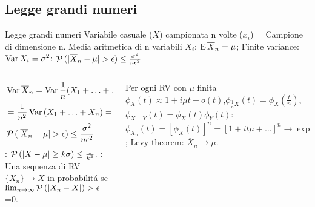 \subsection{Legge grandi numeri}

\begin{frame}{Legge grandi numeri}
Variabile casuale ($X$) campionata n volte ($x_i$) = Campione di dimensione n.
    Media aritmetica di n variabili $X_i$: $\operatorname{E}{\overline{X}_n}=\mu$; Finite variance: $\operatorname{Var}{X_i}=\sigma^2$: $\prob{(|\overline{X}_n-\mu|>\epsilon)}\leq\frac{\sigma^2}{n\epsilon^2}$
    \begin{columns}
    \begin{column}{0.5\textwidth}
\begin{align*}
&\var{\overline{X}_n}=\var{\frac{1}{n}(X_1+\ldots+X_n)}\\
&=\frac{1}{n^2}\var{(X_1+\ldots+X_n)}=\frac{n\sigma^2}{n^2}=\frac{\sigma^2}{n}\\
&\prob{(|\overline{X}_n-\mu|>\epsilon)}\leq\frac{\sigma^2}{n\epsilon^2}
\end{align*}
: $\operatorname{\mathcal{P}}{(|X-\mu|\geq k\sigma)}\leq\frac{1}{k^2}$.
: Una sequenza di RV $\{X_n\}\to X$ in probabilit\'a se $\lim_{n\to\infty}\operatorname{\mathcal{P}}{(|X_n-X|)>\epsilon}$=0.
    \end{column}
    \begin{column}{0.5\textwidth}
Per ogni RV con $\mu$ finita $\phi_X(t)\approx1+i\mu t+o(t)$,$\phi_{\frac{1}{n}X}(t)=\phi_X(\frac{t}{n})$, $\phi_{X+Y}(t)=\phi_X(t)\phi_Y(t)$:
$\phi_{\overline{X}_n}(t)=[\phi_X(t)]^n=[1+it\mu+\ldots]^n\to\exp{i\mu t}$; Levy theorem: $\overline{X}_n\to\mu$.
    \end{column}
    \end{columns}
\end{frame}

